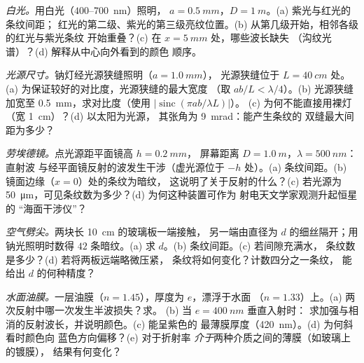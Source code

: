 \begin{exercise}[$\star\star$]\label{exo:b2:two-wave-interference:5}
\emph{白光。}用白光（$400$--\qty{700}{nm}）照明，
$a = \qty{0.5}{mm}$，$D = \qty{1}{m}$。(a) 紫光与红光的条纹间距；
红光的第二级、紫光的第三级亮纹位置。(b)
从第几级开始，相邻各级的红光与紫光条纹
开始重叠？(c) 在 $x = \qty{5}{mm}$ 处，哪些波长缺失
（沟纹光谱）？(d) 解释从中心向外看到的颜色
顺序。
\end{exercise}

\begin{exercise}[$\star\star$]\label{exo:b2:two-wave-interference:6}
\emph{光源尺寸。}钠灯经光源狭缝照明（$a = \qty{1.0}{mm}$），
光源狭缝位于 $L = \qty{40}{cm}$ 处。(a) 为保证较好的对比度，光源狭缝的最大宽度
（取 $ab/L < \lambda/4$）。(b) 光源狭缝
加宽至 \qty{0.5}{mm}，求对比度（使用 $|\operatorname{sinc}(\pi ab/\lambda L)|$）。
(c) 为何不能直接用裸灯（宽 \qty{1}{cm}）？(d) 以太阳为光源，
其张角为 \qty{9}{mrad}：能产生条纹的
双缝最大间距为多少？
\end{exercise}

\begin{exercise}[$\star\star$]\label{exo:b2:two-wave-interference:7}
\emph{劳埃德镜。}点光源距平面镜高 $h = \qty{0.2}{mm}$，
屏幕距离 $D = \qty{1.0}{m}$，$\lambda = \qty{500}{nm}$：直射波
与经平面镜反射的波发生干涉（虚光源位于
$-h$ 处）。(a) 条纹间距。(b) 镜面边缘（$x = 0$）处的条纹为暗纹，
这说明了关于反射的什么？(c) 若光源为
\qty{50}{\micro m}，可见条纹数为多少？(d) 为何这种装置可作为
射电天文学家观测升起恒星的
“海面干涉仪”？
\end{exercise}

\begin{exercise}[$\star\star$]\label{exo:b2:two-wave-interference:8}
\emph{空气劈尖。}两块长 \qty{10}{cm} 的玻璃板一端接触，
另一端由直径为 $d$ 的细丝隔开；用钠光照明时数得
$42$ 条暗纹。(a) 求 $d$。(b) 条纹间距。(c) 若间隙充满水，
条纹数是多少？(d) 若将两板远端略微压紧，
条纹将如何变化？计数四分之一条纹，
能给出 $d$ 的何种精度？
\end{exercise}

\begin{exercise}[$\star\star$]\label{exo:b2:two-wave-interference:9}
\emph{水面油膜。}一层油膜（$n = 1.45$），厚度为 $e$，漂浮于水面
（$n = 1.33$）上。(a) 两次反射中哪一次发生半波损失？求。
(b) 当 $e = \qty{400}{nm}$ 垂直入射时：
求加强与相消的反射波长，并说明颜色。(c) 能呈紫色的
最薄膜厚度（\qty{420}{nm}）。(d) 为何斜看时颜色向
蓝色方向偏移？(e) 对于折射率
\emph{介于}两种介质之间的薄膜（如玻璃上的镀膜），
结果有何变化？
\end{exercise}

